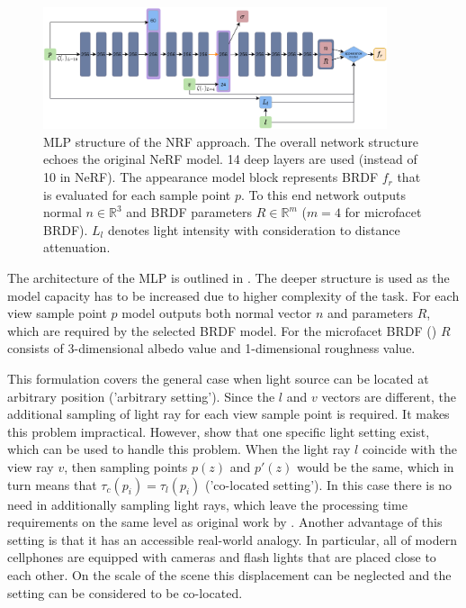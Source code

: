 \begin{figure}[!htb]
    \centering
    \includegraphics[width=0.9\textwidth]{figures/vanilla_nrf.png}
    \caption{MLP structure of the NRF \cite{bi2020neural} approach.
The overall network structure echoes the original NeRF model.
14 deep layers are used (instead of 10 in NeRF).
The appearance model block represents BRDF $f_r$
that is evaluated for each sample point $p$.
To this end network outputs normal $n \in \mathbb{R}^3$
and BRDF parameters $R \in \mathbb{R}^m$ ($m=4$ for microfacet BRDF).
$L_l$ denotes light intensity with consideration to distance attenuation.
}
    \label{fig:nrf_structure}
\end{figure}

The architecture of the MLP is outlined in .
The deeper structure is used as the model capacity has to be increased
due to higher complexity of the task.
For each view sample point $p$ model outputs both normal vector $n$ and parameters $R$,
which are required by the selected BRDF model.
For the microfacet BRDF (\cite{walter2007microfacet}) $R$ consists of 3-dimensional albedo value
and 1-dimensional roughness value.



This formulation covers the general case when light source can be located at arbitrary position ('arbitrary setting').
Since the $l$ and $v$ vectors are different,
the additional sampling of light ray for each view sample point is required.
It makes this problem impractical. %
However, \cite{bi2020neural} show that one specific light setting exist,
which can be used to handle this problem.
When the light ray $l$ coincide with the view ray $v$,
then sampling points $p(z)$ and $p'(z)$ would be the same,
which in turn means that $\tau_c(p_i) = \tau_l(p_i)$ ('co-located setting').
In this case there is no need in additionally sampling light rays,
which leave the processing time requirements on the same level as original work by \cite{mildenhall2020nerf}.
Another advantage of this setting is that it has an accessible real-world analogy.
In particular, all of modern cellphones are equipped with cameras
and flash lights that are placed close to each other.
On the scale of the scene this displacement can be neglected and the setting can be considered to be co-located.

